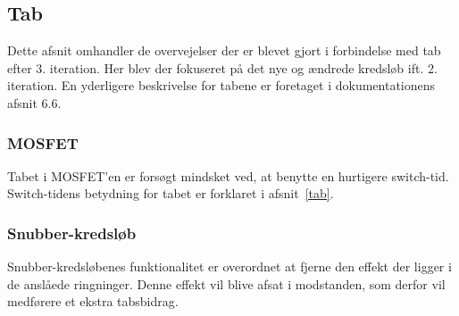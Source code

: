 
\subsection{Tab}
Dette afsnit omhandler de overvejelser der er blevet gjort i forbindelse med tab efter 3. iteration. Her blev der fokuseret på det nye og ændrede kredsløb ift. 2. iteration. En yderligere beskrivelse for tabene er foretaget i dokumentationens afsnit 6.6.

\subsubsection{MOSFET}
\noindent Tabet i MOSFET'en er forsøgt mindsket ved, at benytte en hurtigere switch-tid. Switch-tidens betydning for tabet er forklaret i afsnit~\ref{tab}.


\subsubsection{Snubber-kredsløb}
\noindent Snubber-kredsløbenes funktionalitet er overordnet at fjerne den effekt der ligger i de anslåede ringninger. Denne effekt vil blive afsat i modstanden, som derfor vil medførere et ekstra tabsbidrag.